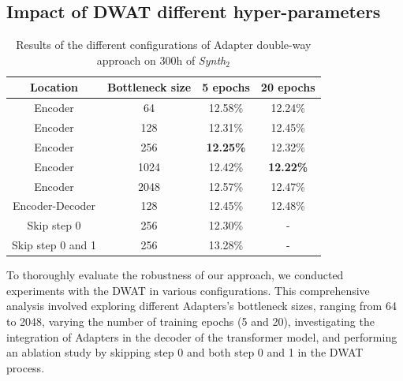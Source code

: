 \subsection{Impact of DWAT different hyper-parameters}
\label{sec:hyperparameter}
\begin{table}[t]
\centering
\begin{tabular}{cccc}
\hline
 Location &  Bottleneck size &  5 epochs &  20 epochs     \\ \hline
\multicolumn{1}{c}{Encoder} & 64 & 12.58\% & 12.24\% \\ 
\multicolumn{1}{c}{Encoder} & 128 &  12.31\% & 12.45\%  \\ 
\multicolumn{1}{c}{Encoder} & 256  & \textbf{12.25\%} & 12.32\%  \\ 
\multicolumn{1}{c}{Encoder} & 1024 & 12.42\% & \textbf{12.22\%} \\ 
\multicolumn{1}{c}{Encoder} & 2048 & 12.57\% & 12.47\% \\ \hline
\multicolumn{1}{c}{Encoder-Decoder} & 128 & 12.45\% & 12.48\% \\ \hline
\multicolumn{1}{c}{Skip step 0} & 256 & 12.30\% & - \\ 
\multicolumn{1}{c}{Skip step 0 and 1} & 256 & 13.28\% & - \\ \hline

\end{tabular}

\caption{Results of the different configurations of Adapter double-way approach on 300h of \textit{Synth$_2$}}
\label{tab:config}
\end{table}
To thoroughly evaluate the robustness of our approach, we conducted experiments with the DWAT in various configurations. This comprehensive analysis involved exploring different Adapters's bottleneck sizes, ranging from 64 to 2048, varying the number of training epochs (5 and 20), investigating the integration of Adapters in the decoder of the transformer model, and performing an ablation study by skipping step 0 and both step 0 and 1 in the DWAT process.

